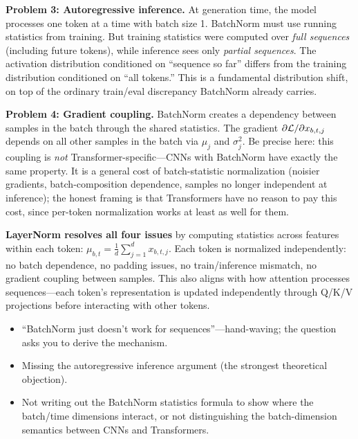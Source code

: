 \begin{interviewq}
\textbf{Problem 3: Autoregressive inference.} At generation time, the model processes one token at a time with batch size 1. BatchNorm must use running statistics from training. But training statistics were computed over \textit{full sequences} (including future tokens), while inference sees only \textit{partial sequences}. The activation distribution conditioned on ``sequence so far'' differs from the training distribution conditioned on ``all tokens.'' This is a fundamental distribution shift, on top of the ordinary train/eval discrepancy BatchNorm already carries.

\textbf{Problem 4: Gradient coupling.} BatchNorm creates a dependency between samples in the batch through the shared statistics. The gradient $\partial \mathcal{L} / \partial x_{b,t,j}$ depends on all other samples in the batch via $\mu_j$ and $\sigma_j^2$. Be precise here: this coupling is \textit{not} Transformer-specific---CNNs with BatchNorm have exactly the same property. It is a general cost of batch-statistic normalization (noisier gradients, batch-composition dependence, samples no longer independent at inference); the honest framing is that Transformers have no reason to pay this cost, since per-token normalization works at least as well for them.

\textbf{LayerNorm resolves all four issues} by computing statistics across features within each token: $\mu_{b,t} = \frac{1}{d}\sum_{j=1}^d x_{b,t,j}$. Each token is normalized independently: no batch dependence, no padding issues, no train/inference mismatch, no gradient coupling between samples. This also aligns with how attention processes sequences---each token's representation is updated independently through Q/K/V projections before interacting with other tokens.

\redflags
\begin{itemize}
    \item ``BatchNorm just doesn't work for sequences''---hand-waving; the question asks you to derive the mechanism.
    \item Missing the autoregressive inference argument (the strongest theoretical objection).
    \item Not writing out the BatchNorm statistics formula to show where the batch/time dimensions interact, or not distinguishing the batch-dimension semantics between CNNs and Transformers.
\end{itemize}



\end{interviewq}
